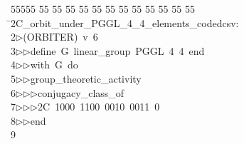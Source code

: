 %
%
\begin{tabbing}
55555 \= 55 \= 55 \= 55 \= 55 \= 55 \= 55 \= 55 \= 55 \= 55 \= 55 \= 55 \= 55 \= \>2C\_orbit\_under\_PGGL\_4\_4\_elements\_codedcsv:\ \\[0pt]
2\>$\triangleright$\>(ORBITER)\ v\ 6\ \\[0pt]
3\>$\triangleright$\>$\triangleright$\>define\ G\ linear\_group\ PGGL\ 4\ 4\ end\ \\[0pt]
4\>$\triangleright$\>$\triangleright$\>with\ G\ do\ \\[0pt]
5\>$\triangleright$\>$\triangleright$\>group\_theoretic\_activity\ \\[0pt]
6\>$\triangleright$\>$\triangleright$\>$\triangleright$\>conjugacy\_class\_of\ \\[0pt]
7\>$\triangleright$\>$\triangleright$\>$\triangleright$\>2C\ 1000\ 1100\ 0010\ 0011\ 0\ \\[0pt]
8\>$\triangleright$\>$\triangleright$\>end\\[0pt]
9\>\end{tabbing}
